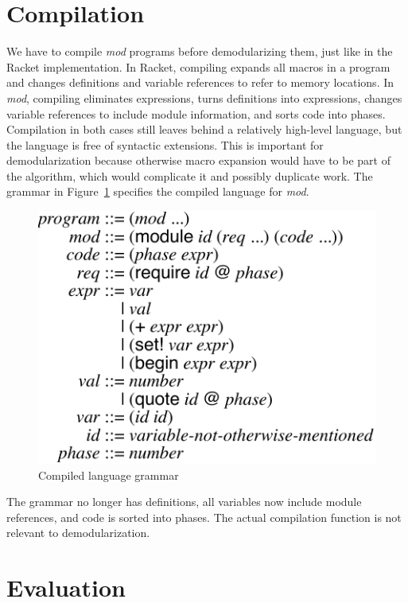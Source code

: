 \section{Compilation}

We have to compile \emph{mod} programs before demodularizing them, just like in the Racket implementation.
In Racket, compiling expands all macros in a program and changes definitions and variable references to refer to memory locations.
In \emph{mod}, compiling eliminates  expressions, turns definitions into  expressions, changes variable references to include module information, and sorts code into phases.
Compilation in both cases still leaves behind a relatively high-level language, but the language is free of syntactic extensions.
This is important for demodularization because otherwise macro expansion would have to be part of the algorithm, which would complicate it and possibly duplicate work.
The grammar in Figure~\ref{fig:compiled-lang} specifies the compiled language for \emph{mod}.

\begin{figure}[h]
\centering
\includegraphics{figures/compiled-lang}
\caption{Compiled language grammar}
\label{fig:compiled-lang}
\end{figure}

The grammar no longer has definitions, all variables now include module references, and code is sorted into phases.
The actual compilation function is not relevant to demodularization.

\section{Evaluation}

